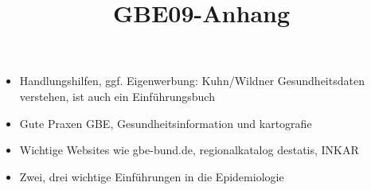 \documentclass{article}
\begin{document}
\title{GBE09-Anhang}

\maketitle

\begin{itemize}
\item Handlungshilfen, ggf. Eigenwerbung: Kuhn/Wildner Gesundheitsdaten verstehen, ist auch ein Einführungsbuch


\item Gute Praxen GBE, Gesundheitsinformation und kartografie


\item Wichtige Websites wie gbe-bund.de, regionalkatalog destatis, INKAR


\item Zwei, drei wichtige Einführungen in die Epidemiologie


\end{itemize}
\end{document}

